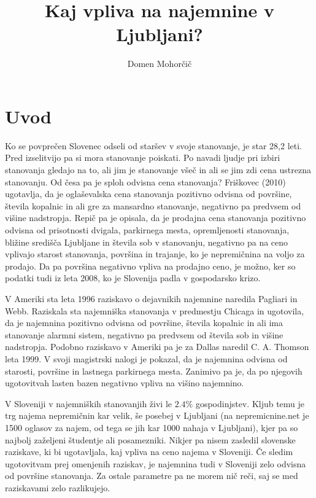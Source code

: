 \documentclass[a4paper, 12pt]{article}
\begin{document}
\title{Kaj vpliva na najemnine v Ljubljani?}
\author{Domen Mohorčič}
\maketitle

\section{Uvod}

Ko se povprečen Slovenec odseli od staršev v svoje stanovanje, je star 28,2
leti. Pred izselitvijo pa si mora stanovanje poiskati. Po navadi ljudje pri izbiri
stanovanja gledajo na to, ali jim je stanovanje všeč in ali se jim zdi cena
ustrezna stanovanju. Od česa pa je sploh odvisna cena stanovanja? Friškovec
(2010) ugotavlja, da je oglaševalska cena stanovanja pozitivno odvisna od
površine, števila kopalnic in ali gre za mansardno stanovanje, negativno pa
predvsem od višine nadstropja. Repič pa je opisala, da je prodajna cena
stanovanja pozitivno odvisna od prisotnosti dvigala, parkirnega mesta,
opremljenosti stanovanja, bližine središča Ljubljane in števila sob v
stanovanju, negativno pa na ceno vplivajo starost stanovanja, površina in
trajanje, ko je nepremičnina na voljo za prodajo. Da pa površina negativno vpliva
na prodajno ceno, je možno, ker so podatki tudi iz leta 2008, ko je Slovenija
padla v gospodarsko krizo.

V Ameriki sta leta 1996 raziskavo o dejavnikih najemnine naredila Pagliari
in Webb. Raziskala sta najemniška stanovanja v predmestju Chicaga in ugotovila,
da je najemnina pozitivno odvisna od površine, števila kopalnic in ali ima
stanovanje alarmni sistem, negativno pa predvsem od števila sob in višine
nadstropja. Podobno raziskavo v Ameriki pa je za Dallas naredil C. A. Thomson
leta 1999. V svoji magistrski nalogi je pokazal, da je najemnina odvisna od
starosti, površine in lastnega parkirnega mesta. Zanimivo pa je, da po njegovih
ugotovitvah lasten bazen negativno vpliva na višino najemnino.

V Sloveniji v najemniških stanovanjih živi le $ 2.4\% $ gospodinjstev.
Kljub temu je trg najema nepremičnin kar velik, še posebej v Ljubljani (na
nepremicnine.net je 1500 oglasov za najem, od tega se jih kar 1000 nahaja v Ljubljani),
kjer pa so najbolj zaželjeni študentje ali posamezniki. Nikjer pa nisem
zasledil slovenske raziskave, ki bi ugotavljala, kaj vpliva na ceno najema v Sloveniji.
Če sledim ugotovitvam prej omenjenih raziskav, je najemnina tudi v Sloveniji zelo
odvisna od površine stanovanja. Za ostale parametre pa ne morem nič reči, saj
se med raziskavami zelo razlikujejo.
\end{document}
